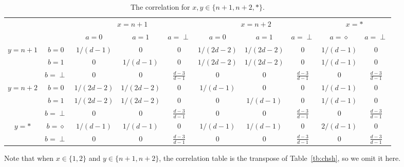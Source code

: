 \documentclass[11pt,letterpaper]{article}
\newcommand{\1}{\mathbb{1}}
\theoremstyle{definition}
\begin{document}
\begin{table}[H]
\begin{center}
\begin{tabular}{|c|c||c|c|c|c|c|c|c|c|}
\hline
\multicolumn{2}{|c|}{} &
\multicolumn{3}{|c|}{$x=n+1$}&
\multicolumn{3}{|c|}{$x=n+2$}&
\multicolumn{2}{|c|}{$x=\ast$}\\
\cline{3-10}
\multicolumn{2}{|c|}{} &
$a = 0$ & $a=1$ & $a=\perp$ &
$a = 0$ & $a=1$ & $a=\perp$ &
$a = \diamond$ & $a = \perp$\\
\hline
\hline
\multirow{3}{*}{$y = n+1$} & $b=0$ & $1/(d-1)$ & $0$ & 0 
& $1/(2d-2)$ & $1/(2d-2)$ & 0 & $1/(d-1)$ & 0 \\
\cline{2-10}
&$b=1$ & 0 & $1/(d-1)$ & $0$ 
&  $1/(2d-2)$ & $1/(2d-2)$ & 0 &$1/(d-1)$ & 0 \\
\cline{2-10}
&$b=\perp$ & 0 & 0 & $\frac{d-3}{d-1}$ 
&  0 & 0 & \small $\frac{d-3}{d-1} $ &0 & \small $\frac{d-3}{d-1}$ \\
\hline
\multirow{3}{*}{$y = n+2$} & $b=0$ & $1/(2d-2)$ & $1/(2d-2)$ & 0 
& $1/(d-1)$ & $0$ & 0 & $1/(d-1)$ & 0 \\
\cline{2-10}
&$b=1$ & $1/(2d-2)$ & $1/(2d-2)$ & $0$ 
&  0 & $1/(d-1)$ & $0$ &$1/(d-1)$ & 0 \\
\cline{2-10}
&$b=\perp$ & 0 & 0 & \small $\frac{d-3}{d-1}$ 
&  0 & 0 & \small $\frac{d-3}{d-1} $ &0 &\small $\frac{d-3}{d-1}$ \\
\hline
\multirow{2}{*}{$y = \ast$} & $b=\diamond$ & $1/(d-1)$ & $1/(d-1)$ & 0 
& $1/(d-1)$ & $1/(d-1)$ & 0 & $2/(d-1)$ & 0 \\
\cline{2-10}
&$b=\perp$ & 0 & 0 & $\frac{d-3}{d-1}$ 
&  0 & 0 & \small $\frac{d-3}{d-1} $ &0 & \small $\frac{d-3}{d-1}$ \\
\hline
\end{tabular}
\end{center}
\caption{The correlation for $x ,y\in\{n+1,n+2, \ast\} $.}
\end{table}
Note that when $x \in \{1,2\}$ and $y \in \{n+1, n+2\}$, the correlation table is 
the transpose of Table~\ref{tb:chsh}, so we omit it here.
\end{document}
